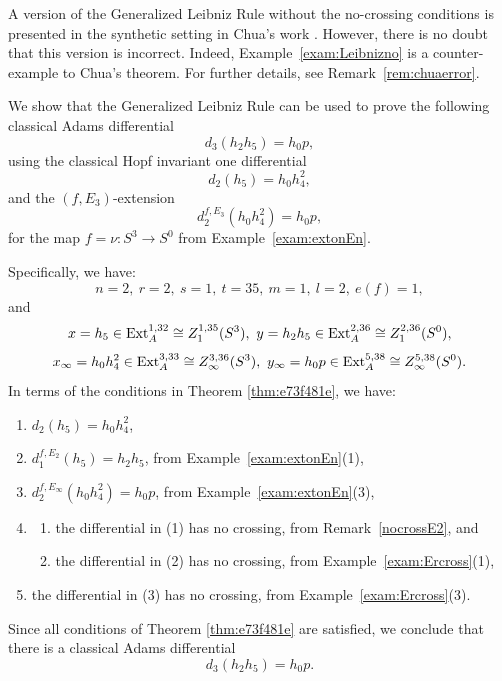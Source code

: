 \documentclass{amsart}
\numberwithin{equation}{section}
\begin{document}
\begin{remark}
    A version of the Generalized Leibniz Rule without the no-crossing conditions is presented in the synthetic setting in Chua's work \cite[Theorem~12.9]{Chua}. However, there is no doubt that this version is incorrect. Indeed, Example~\ref{exam:Leibnizno} is a counter-example to Chua's theorem. For further details, see Remark~\ref{rem:chuaerror}.
\end{remark}

\begin{example} \label{exam:Leibnizyes}
 We show that the Generalized Leibniz Rule can be used to prove the following classical Adams differential
    $$d_3(h_2 h_5) = h_0 p,$$
    using the classical Hopf invariant one differential
    $$d_2(h_5) = h_0 h_4^2,$$
    and the $(f, E_3)$-extension
        $$d_2^{f, E_3} (h_0h_4^2) = h_0 p,$$
        for the map $f = \nu: S^3 \rightarrow S^0$ from Example~\ref{exam:extonEn}.

        Specifically, we have:
        $$n=2, \ r=2, \ s=1, \ t=35, \ m=1, \ l=2, \ e(f)=1,$$
        and 
        $$x=h_5 \in \mathrm{Ext}_A^{1,32} \cong Z_1^{1,35}(S^3), \ y=h_2h_5 \in \mathrm{Ext}_A^{2,36} \cong Z_1^{2,36}(S^0),$$
        $$x_\infty=h_0h_4^2 \in \mathrm{Ext}_A^{3,33} \cong Z_\infty^{3,36}(S^3), \ y_\infty=h_0p \in \mathrm{Ext}_A^{5,38} \cong Z_\infty^{5,38}(S^0).$$
In terms of the conditions in Theorem \ref{thm:e73f481e}, we have:
      \begin{enumerate}
      \item $d_2(h_5) = h_0h_4^2$,
      \item $d_1^{f, E_2}(h_5) = h_2h_5$, from Example~\ref{exam:extonEn}(1),
      \item $d_2^{f, E_\infty} (h_0h_4^2) = h_0 p$, from Example~\ref{exam:extonEn}(3),
      \item 
      \begin{enumerate}
          \item the differential in (1) has no crossing, from Remark~\ref{nocrossE2}, and
          \item the differential in (2) has no crossing, from Example~\ref{exam:Ercross}(1), 
      \end{enumerate}
      \item the differential in (3) has no crossing, from Example~\ref{exam:Ercross}(3).
      \end{enumerate}
      Since all conditions of Theorem \ref{thm:e73f481e} are satisfied, we conclude that there is a classical Adams differential
      $$d_3(h_2 h_5) = h_0 p.$$
\end{example}
\end{document}
